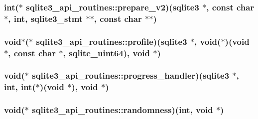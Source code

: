\hypertarget{structsqlite3__api__routines_adf1956e4240b4573ec5d1c0e079a0dc2}{
\subsubsection[{prepare\-\_\-v2}]{\setlength{\rightskip}{0pt plus 5cm}int($\ast$ sqlite3\-\_\-api\-\_\-routines\-::prepare\-\_\-v2)({\bf sqlite3} $\ast$, const char $\ast$, int, {\bf sqlite3\-\_\-stmt} $\ast$$\ast$, const char $\ast$$\ast$)}}\label{structsqlite3__api__routines_adf1956e4240b4573ec5d1c0e079a0dc2}
\hypertarget{structsqlite3__api__routines_aa3613866ee257c4b50e78bec33b7fb3a}{
\subsubsection[{profile}]{\setlength{\rightskip}{0pt plus 5cm}void$\ast$($\ast$ sqlite3\-\_\-api\-\_\-routines\-::profile)({\bf sqlite3} $\ast$, void($\ast$)(void $\ast$, const char $\ast$, {\bf sqlite\-\_\-uint64}), void $\ast$)}}\label{structsqlite3__api__routines_aa3613866ee257c4b50e78bec33b7fb3a}
\hypertarget{structsqlite3__api__routines_a2888055619addf1d754e25d159d85718}{
\subsubsection[{progress\-\_\-handler}]{\setlength{\rightskip}{0pt plus 5cm}void($\ast$ sqlite3\-\_\-api\-\_\-routines\-::progress\-\_\-handler)({\bf sqlite3} $\ast$, int, int($\ast$)(void $\ast$), void $\ast$)}}\label{structsqlite3__api__routines_a2888055619addf1d754e25d159d85718}
\hypertarget{structsqlite3__api__routines_a4135547c03dfacc513274bb007386d05}{
\subsubsection[{randomness}]{\setlength{\rightskip}{0pt plus 5cm}void($\ast$ sqlite3\-\_\-api\-\_\-routines\-::randomness)(int, void $\ast$)}}\label{structsqlite3__api__routines_a4135547c03dfacc513274bb007386d05}
